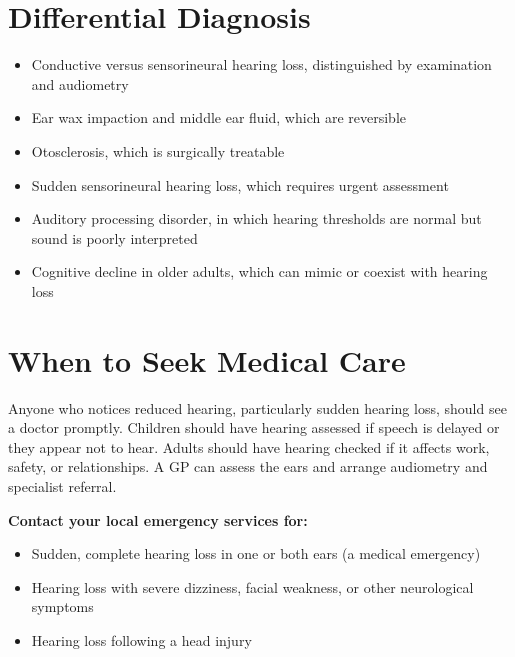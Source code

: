 \section*{Differential Diagnosis}
\begin{itemize}
    \item Conductive versus sensorineural hearing loss, distinguished by examination and audiometry
    \item Ear wax impaction and middle ear fluid, which are reversible
    \item Otosclerosis, which is surgically treatable
    \item Sudden sensorineural hearing loss, which requires urgent assessment
    \item Auditory processing disorder, in which hearing thresholds are normal but sound is poorly interpreted
    \item Cognitive decline in older adults, which can mimic or coexist with hearing loss
\end{itemize}

\section*{When to Seek Medical Care}
Anyone who notices reduced hearing, particularly sudden hearing loss, should see a doctor promptly. Children should have hearing assessed if speech is delayed or they appear not to hear. Adults should have hearing checked if it affects work, safety, or relationships. A GP can assess the ears and arrange audiometry and specialist referral.

\textbf{Contact your local emergency services for:}
\begin{itemize}
    \item Sudden, complete hearing loss in one or both ears (a medical emergency)
    \item Hearing loss with severe dizziness, facial weakness, or other neurological symptoms
    \item Hearing loss following a head injury
\end{itemize}


